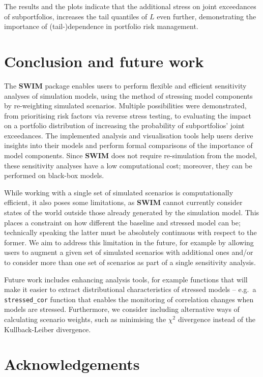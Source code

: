 \documentclass[
]{article}
\begin{document}
The results and the plots indicate that the additional stress on joint exceedances of subportfolios, increases the tail quantiles of \(L\) even further, demonstrating the importance of (tail-)dependence in portfolio risk management.

\hypertarget{conclusion-and-future-work}{%
\section{Conclusion and future work}\label{conclusion-and-future-work}}

The \textbf{SWIM} package enables users to perform flexible and efficient sensitivity analyses of simulation models, using the method of stressing model components by re-weighting simulated scenarios. Multiple possibilities were demonstrated, from prioritising risk factors via reverse stress testing, to evaluating the impact on a portfolio distribution of increasing the probability of subportfolios' joint exceedances. The implemented analysis and visualisation tools help users derive insights into their models and perform formal comparisons of the importance of model components. Since \textbf{SWIM} does not require re-simulation from the model, these sensitivity analyses have a low computational cost; moreover, they can be performed on black-box models.

While working with a single set of simulated scenarios is computationally efficient, it also poses some limitations, as \textbf{SWIM} cannot currently consider states of the world outside those already generated by the simulation model. This places a constraint on how different the baseline and stressed model can be; technically speaking the latter must be absolutely continuous with respect to the former. We aim to address this limitation in the future, for example by allowing users to augment a given set of simulated scenarios with additional ones and/or to consider more than one set of scenarios as part of a single sensitivity analysis.

Future work includes enhancing analysis tools, for example functions that will make it easier to extract distributional characteristics of stressed models -- e.g.~a \texttt{stressed\_cor} function that enables the monitoring of correlation changes when models are stressed. Furthermore, we consider including alternative ways of calculating scenario weights, such as minimising the \(\chi^2\) divergence instead of the Kullback-Leiber divergence.

\hypertarget{acknowledgements}{%
\section*{Acknowledgements}\label{acknowledgements}}
\end{document}
